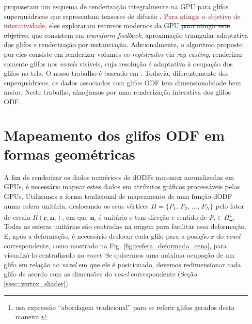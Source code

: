  propuseram um esquema de renderização integralmente na GPU para glifos superquádricos que representam tensores de difusão \cite{Kindlmann2004}. \textcolor{red}{Para atingir o objetivo de interatividade,} eles exploraram recursos modernos da GPU\sout{ para atingir este objetivo}, que consistem em \textit{transform feedback}, aproximação triangular adaptativa dos glifos e renderização por instanciação. Adicionalmente, o algoritmo proposto por eles consiste em renderizar volumes \textit{co-registrados} via \textit{ray-casting}, renderizar somente glifos nos \textit{voxels} visíveis, cuja resolução 
é adaptativa à ocupação dos glifos na tela. O nosso trabalho é baseado em . Todavia, diferentemente dos superquádricos, os dados associados com glifos ODF tem dimensionalidade bem maior. Neste trabalho, almejamos por uma renderização interativa dos glifos ODF.

\section{Mapeamento dos glifos ODF em formas geométricas}
\label{sec::renderizacao_de_glifos_ODF}


A fim de renderizar os dados numéricos de dODFs min-max normalizadas em GPUs, é necessário mapear estes dados em atributos gráficos processáveis pelas GPUs. Utilizamos a forma tradicional de mapeamento de uma função dODF numa esfera unitária, deslocando os seus vértices $\Pi = \{
P_1$,
$P_2$, ...,
$P_N
\}$
pelo fator de escala $R(\mathbf{r}, \mathbf{n}_i)$, em que $\mathbf{n}_i$ é unitário e tem direção e sentido de $P_i \in \Pi$\footnote{ usa expressão ``abordagem tradicional'' para se referir glifos gerados desta maneira.}. Todas as esferas unitárias são centradas na origem para facilitar essa deformação. E, após a deformação, é necessário deslocar cada glifo para a posição $\mathbf{r}$ do \textit{voxel} correspondente, como mostrado na Fig. \ref{fig::esfera_deformada_cena}, para visualizá-lo centralizado no \textit{voxel}. Se quisermos uma máxima ocupação de um glifo em relação ao \textit{voxel} em que ele é posicionado, devemos redimensionar cada glifo de acordo com as dimensões do \textit{voxel} correspondente (Seção \ref{ssec::vertex_shader}).

